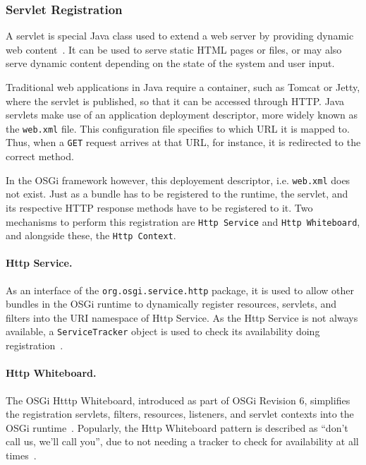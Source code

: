 \documentclass[12pt]{article}
\begin{document}
\subsubsection{Servlet Registration}

A servlet is special Java class used to extend a web server by providing dynamic web content~\cite{servlet}. It can be used to serve static HTML pages or files, or may also serve dynamic content depending on the state of the system and user input.

Traditional web applications in Java require a container, such as Tomcat or Jetty, where the servlet is published, so that it can be accessed through HTTP. Java servlets make use of an application deployment descriptor, more widely known as the \texttt{web.xml} file. This configuration file specifies to which URL it is mapped to. Thus, when a \texttt{GET} request arrives at that URL, for instance, it is redirected to the correct method.

In the OSGi framework however, this deployement descriptor, i.e. \texttt{web.xml} does not exist. Just as a bundle has to be registered to the runtime, the servlet, and its respective HTTP response methods have to be registered to it. Two mechanisms to perform this registration are \texttt{Http Service} and \texttt{Http Whiteboard}, and alongside these, the \texttt{Http Context}.

\paragraph{Http Service.} As an interface of the \texttt{org.osgi.service.http} package, it is used to allow other bundles in the OSGi runtime to dynamically register resources, servlets, and filters into the URI namespace of Http Service. As the Http Service is not always available, a \texttt{ServiceTracker} object is used to check its availability doing registration~\cite{httpservice}. 

\paragraph{Http Whiteboard.} The OSGi Htttp Whiteboard, introduced as part of OSGi Revision 6, simplifies the registration servlets, filters, resources, listeners, and servlet contexts into the OSGi runtime~\cite{httpwhiteboard_01}. Popularly, the Http Whiteboard pattern is described as ``don't call us, we'll call you'', due to not needing a tracker to check for availability at all times~\cite{httpwhiteboard_02}.
\end{document}
